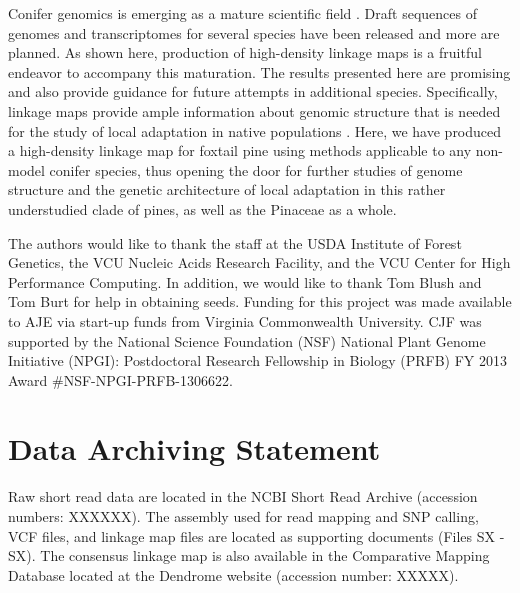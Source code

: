 \documentclass[smallextended]{svjour3}
\begin{document}
Conifer genomics is emerging as a mature scientific field
\citep{Mackay:2012}. Draft sequences of genomes and transcriptomes for several
species have been released and more are planned. As shown here, production of
high-density linkage maps is a fruitful endeavor to accompany this
maturation. The results presented here are promising and also provide guidance
for future attempts in additional species.  Specifically, linkage maps provide ample
information about genomic structure that is needed for the study of local
adaptation in native populations \citep[cf.,][]{Limborg:2014}. Here, we have produced a high-density
linkage map for foxtail pine using methods applicable to any non-model conifer
species, thus opening the door for further studies of genome structure and the
genetic architecture of local adaptation in this rather understudied clade of
pines, as well as the Pinaceae as a whole.

\begin{acknowledgements}
  The authors would like to thank the staff at the USDA Institute of Forest
  Genetics, the VCU Nucleic Acids Research Facility, and the VCU Center for High
  Performance Computing.  In addition, we would like to thank Tom Blush and Tom
  Burt for help in obtaining seeds. Funding for this project was made available
  to AJE via start-up funds from Virginia Commonwealth University. CJF was
  supported by the National Science Foundation (NSF) National Plant Genome
  Initiative (NPGI): Postdoctoral Research Fellowship in Biology (PRFB) FY 2013
  Award \#NSF-NPGI-PRFB-1306622.
\end{acknowledgements}


\section*{Data Archiving Statement}

Raw short read data are located in the NCBI Short Read Archive (accession
numbers: XXXXXX).  The assembly used for read mapping and SNP calling, VCF
files, and linkage map files are located as supporting documents (Files SX -
SX).  The consensus linkage map is also available in the Comparative Mapping
Database located at the Dendrome website (accession number: XXXXX).


\clearpage





\clearpage
\end{document}
